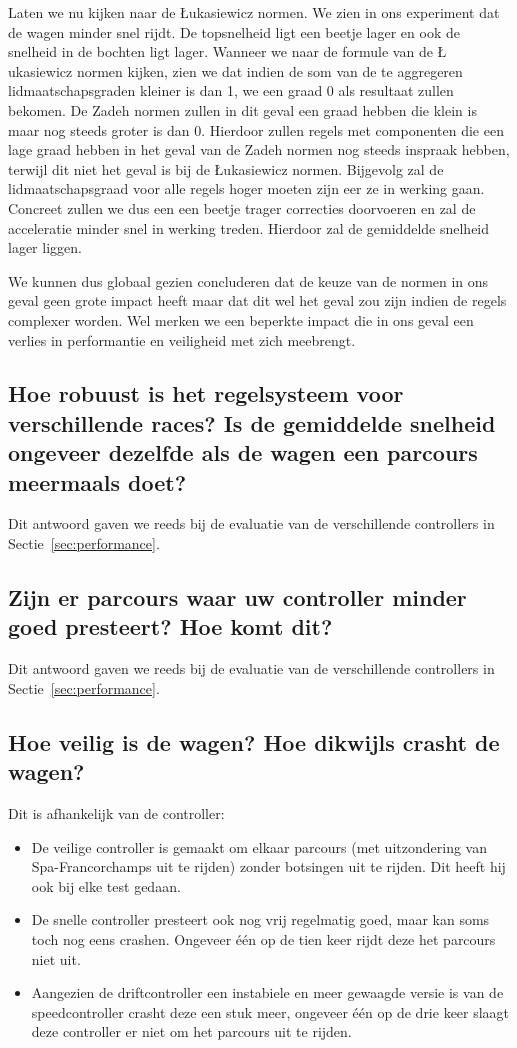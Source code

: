Laten we nu kijken naar de \L ukasiewicz normen. We zien in ons experiment dat 
de wagen minder snel rijdt. De topsnelheid ligt een beetje lager en ook de 
snelheid in de bochten ligt lager. Wanneer we naar de formule van de  \L 
ukasiewicz normen kijken, zien we dat indien de som van de te aggregeren 
lidmaatschapsgraden kleiner is dan 1, we een graad 0 als resultaat zullen 
bekomen. De Zadeh normen zullen in dit geval een graad hebben die klein is maar 
nog steeds groter is dan 0. Hierdoor zullen regels met componenten die een lage 
graad hebben in het geval van de Zadeh normen nog steeds inspraak hebben, 
terwijl dit niet het geval is bij de \L ukasiewicz normen. Bijgevolg zal de 
lidmaatschapsgraad voor alle regels hoger moeten zijn eer ze in werking gaan. 
Concreet zullen we dus een een beetje trager correcties doorvoeren en zal de 
acceleratie minder snel in werking treden. Hierdoor zal de gemiddelde snelheid 
lager liggen.

We kunnen dus globaal gezien concluderen dat de keuze van de normen in ons geval geen grote impact heeft maar dat dit wel het geval zou zijn indien de regels complexer worden. Wel merken we een beperkte impact die in ons geval een verlies in performantie en veiligheid met zich meebrengt.


\subsection{Hoe robuust is het regelsysteem voor verschillende races? Is de 
gemiddelde snelheid ongeveer dezelfde als de wagen een parcours meermaals doet?}
Dit antwoord gaven we reeds bij de evaluatie van de verschillende controllers 
in Sectie~\ref{sec:performance}.

\subsection{Zijn er parcours waar uw controller minder goed presteert? Hoe komt 
dit?}
Dit antwoord gaven we reeds bij de evaluatie van de verschillende controllers 
in Sectie~\ref{sec:performance}.

\subsection{Hoe veilig is de wagen? Hoe dikwijls crasht de wagen?}
Dit is afhankelijk van de controller: 
\begin{itemize}
\item De veilige controller is gemaakt om elkaar parcours (met uitzondering van 
Spa-Francorchamps uit te rijden) zonder botsingen uit te rijden. Dit heeft hij 
ook bij elke test gedaan.
\item De snelle controller presteert ook nog vrij regelmatig goed, maar kan soms 
toch nog eens crashen. Ongeveer één op de tien keer rijdt deze het parcours 
niet uit.
\item Aangezien de driftcontroller een instabiele en meer gewaagde versie is 
van de speedcontroller crasht deze een stuk meer, ongeveer één op de drie keer 
slaagt deze controller er niet om het parcours uit te rijden.
\end{itemize}

